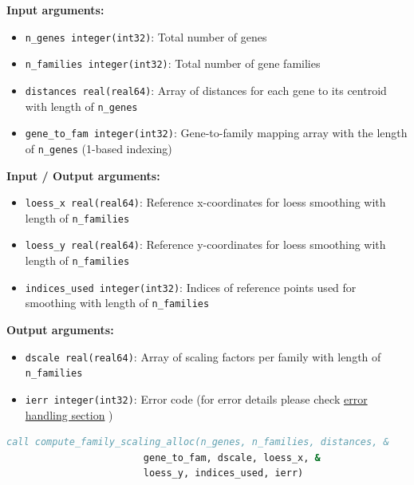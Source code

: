 \begin{enumerate}
\begin{enumerate}
                  \textbf{Input arguments:}
                  \begin{itemize}
                    \item \texttt{n\_genes integer(int32)}: Total number of genes
                          
                    \item \texttt{n\_families integer(int32)}: Total number of gene families
                          
                    \item \texttt{distances real(real64)}: Array of distances for each
                          gene to its centroid with length of \texttt{n\_genes}
                          
                    \item \texttt{gene\_to\_fam integer(int32)}: Gene-to-family mapping
                          array with the length of \texttt{n\_genes} (1-based indexing)
                  \end{itemize}
                  
                  \textbf{Input / Output arguments:}
                  \begin{itemize}
                    \item \texttt{loess\_x real(real64)}: Reference x-coordinates for
                          loess smoothing with length of \texttt{n\_families}
                          
                    \item \texttt{loess\_y real(real64)}: Reference y-coordinates for
                          loess smoothing with length of \texttt{n\_families}
                          
                    \item \texttt{indices\_used integer(int32)}: Indices of reference
                          points used for smoothing with length of \texttt{n\_families}
                  \end{itemize}
                  
                  \textbf{Output arguments:}
                  \begin{itemize}
                    \item \texttt{dscale real(real64)}: Array of scaling factors per
                          family with length of \texttt{n\_families}
                          
                    \item \texttt{ierr integer(int32)}: Error code (for error
                          details please check
                          \hyperref[sec:error-handling]{error handling section} )
                  \end{itemize}
                  \begin{lstlisting}[language=Fortran, caption={Compute Family Scaling}]
call compute_family_scaling_alloc(n_genes, n_families, distances, &
                        gene_to_fam, dscale, loess_x, &
                        loess_y, indices_used, ierr)
                  \end{lstlisting}
                  

\end{enumerate}
\end{enumerate}
